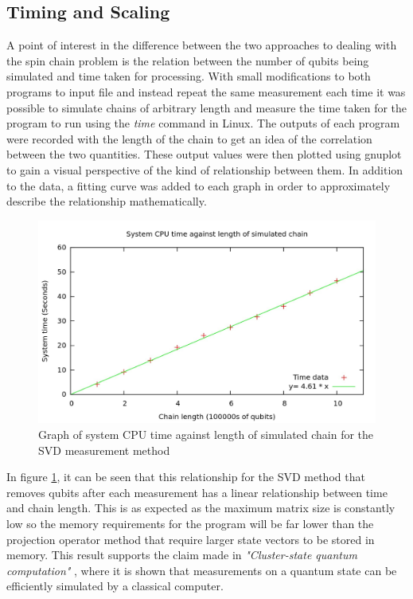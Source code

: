 
\subsection{Timing and Scaling}

A point of interest in the difference between the two approaches to dealing with the spin chain problem is the relation between the number of qubits being simulated and time taken for processing. With small modifications to both programs to input file and instead repeat the same measurement each time it was possible to simulate chains of arbitrary length and measure the time taken for the program to run using the \textit{time} command in Linux. The outputs of each program were recorded with the length of the chain to get an idea of the correlation between the two quantities. These output values were then plotted using gnuplot to gain a visual perspective of the kind of relationship between them. In addition to the data, a fitting curve was added to each graph in order to approximately describe the relationship mathematically. 

\begin{figure}
\centering
\includegraphics[scale=0.20]{gfx/singlechain_time_graph.jpg}
\caption{Graph of system CPU time against length of simulated chain for the SVD measurement method \label{fig:length_v_time_1}}
\end{figure}

In figure \ref{fig:length_v_time_1}, it can be seen that this relationship for the SVD method that removes qubits after each measurement has a linear relationship between time and chain length. This is as expected as the maximum matrix size is constantly low so the memory requirements for the program will be far lower than the projection operator method that require larger state vectors to be stored in memory. This result supports the claim made in \textit{"Cluster-state quantum computation"} \citep{nielsen_cluster-state_2006}, where it is shown that measurements on a quantum state can be efficiently simulated by a classical computer.


